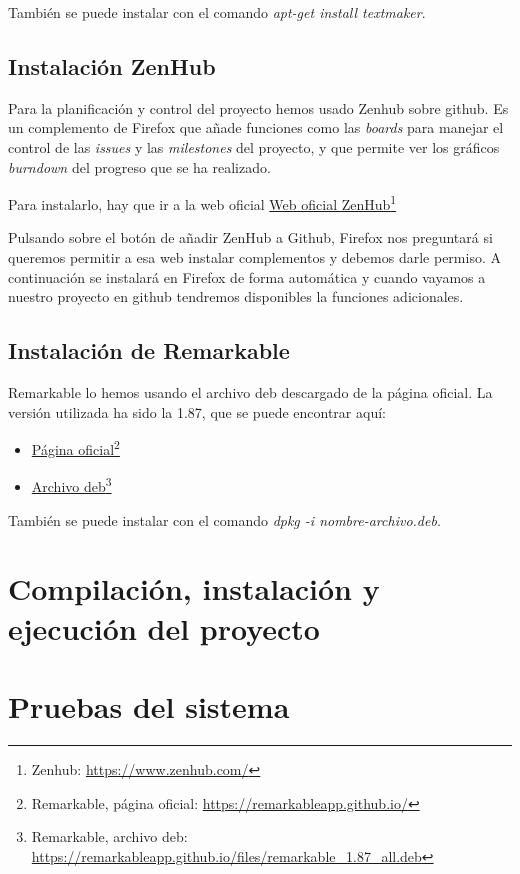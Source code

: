 También se puede instalar con el comando \textit{apt-get install textmaker}.

\subsection{Instalación ZenHub}

Para la planificación y control del proyecto hemos usado Zenhub sobre github. Es un complemento de Firefox que añade funciones como las \textit{boards} para manejar el control de las \textit{issues} y las \textit{milestones} del proyecto, y que permite ver los gráficos \textit{burndown} del progreso que se ha realizado.

Para instalarlo, hay que ir a la web oficial
\href{https://www.zenhub.com/}{Web oficial ZenHub}\footnote{Zenhub: \url{https://www.zenhub.com/}}

Pulsando sobre el botón de añadir ZenHub a Github, Firefox nos preguntará si queremos permitir a esa web instalar complementos y debemos darle permiso. A continuación se instalará en Firefox de forma automática y cuando vayamos a nuestro proyecto en github tendremos disponibles la funciones adicionales.

\subsection{Instalación de Remarkable}
Remarkable lo hemos usando el archivo deb descargado de la página oficial. La versión utilizada ha sido la 1.87, que se puede encontrar aquí:

\begin{itemize}
\item \href{https://remarkableapp.github.io/}{Página oficial}\footnote{Remarkable, página oficial: \url{https://remarkableapp.github.io/}}
\item \href{https://remarkableapp.github.io/files/remarkable_1.87_all.deb
}{Archivo deb}\footnote{Remarkable, archivo deb: \url{https://remarkableapp.github.io/files/remarkable_1.87_all.deb}}
\end{itemize}

También se puede instalar con el comando \textit{dpkg -i nombre-archivo.deb}.

\section{Compilación, instalación y ejecución del proyecto}

\section{Pruebas del sistema}
